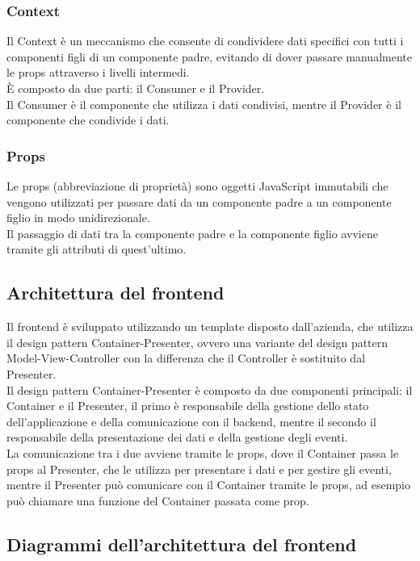 \subsubsection{Context}
Il Context è un meccanismo che consente di condividere dati specifici con tutti i componenti figli di un componente padre, evitando di dover passare manualmente le props attraverso i livelli intermedi.\\
È composto da due parti: il Consumer e il Provider.\\
Il Consumer è il componente che utilizza i dati condivisi, mentre il Provider è il componente che condivide i dati.\\
\subsubsection{Props}
Le props (abbreviazione di proprietà) sono oggetti JavaScript immutabili che vengono utilizzati per passare dati da un componente padre a un componente figlio in modo unidirezionale.\\
Il passaggio di dati tra la componente padre e la componente figlio avviene tramite gli attributi di quest'ultimo.\\

\subsection{Architettura del frontend}
Il frontend è sviluppato utilizzando un template disposto dall'azienda, che utilizza il design pattern Container-Presenter, ovvero una variante del design pattern Model-View-Controller con la differenza che il Controller è sostituito dal Presenter.\\
Il design pattern Container-Presenter è composto da due componenti principali: il Container e il Presenter, il primo è responsabile della gestione dello stato dell'applicazione e della comunicazione con il backend, mentre il secondo il responsabile della presentazione dei dati e della gestione degli eventi.\\
La comunicazione tra i due avviene tramite le props, dove il Container passa le props al Presenter, che le utilizza per presentare i dati e per gestire gli eventi, mentre il Presenter può comunicare con il Container tramite le props, ad esempio può chiamare una funzione del Container passata come prop.\\
\subsection{Diagrammi dell'architettura del frontend}
